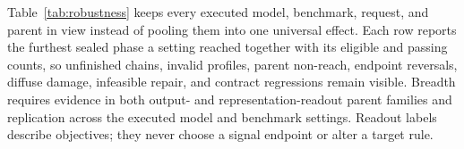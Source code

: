 Table~\ref{tab:robustness} keeps every executed model, benchmark, request,
and parent in view instead of pooling them into one universal effect. Each
row reports the furthest sealed phase a setting reached together with its
eligible and passing counts, so unfinished chains, invalid
profiles, parent non-reach, endpoint reversals, diffuse damage, infeasible
repair, and contract regressions remain visible. Breadth requires evidence in both output-
and representation-readout parent families and replication across the
executed model and benchmark settings. Readout labels describe objectives;
they never choose a signal endpoint or alter a target rule.



